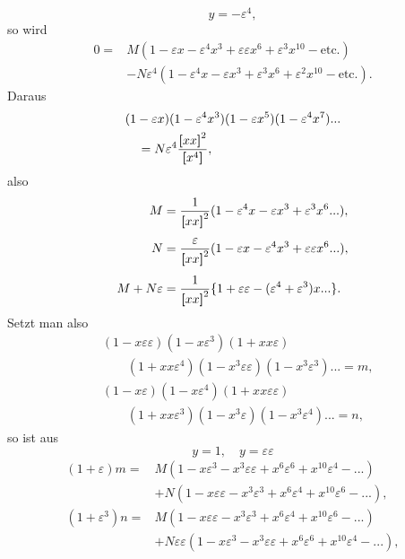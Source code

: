 \[y=-\varepsilon^4,\]
\noindent so wird
\[\begin{aligned}
0={}&M(1-\varepsilon x-\varepsilon^4x^3+\varepsilon\varepsilon x^6+\varepsilon^3x^{10}-\text{etc.})\\
&-N\varepsilon^4(1-\varepsilon^4x-\varepsilon x^3+\varepsilon^3x^6+\varepsilon^2x^{10}-\text{etc.}).
\end{aligned}\]
\noindent Daraus
\[\begin{aligned}
&(1-\varepsilon x)(1-\varepsilon^4x^3)(1-\varepsilon x^5)(1-\varepsilon^4x^7){.}{.}{.}\\
&\quad=N\varepsilon^4\frac{\boldsymbol{[}xx\boldsymbol{]}^2}{\boldsymbol{[}x^4\boldsymbol{]}},
\end{aligned}\]
\noindent also
\[\begin{aligned}
M&=\frac1{\boldsymbol{[}xx\boldsymbol{]}^2}(1-\varepsilon^4x-\varepsilon x^3+\varepsilon^3x^6{.}{.}{.}),\\[4pt]
N&=\frac\varepsilon{\boldsymbol{[}xx\boldsymbol{]}^2}(1-\varepsilon x-\varepsilon^4x^3+\varepsilon\varepsilon x^6{.}{.}{.}),\\[4pt]
M+N\varepsilon&=\frac1{\boldsymbol{[}xx\boldsymbol{]}^2}\{1+\varepsilon\varepsilon-(\varepsilon^4+\varepsilon^3)x{.}{.}{.}\}.
\end{aligned}\]
\noindent Setzt man also
\[\begin{aligned}
&(1-x\varepsilon\varepsilon)(1-x\varepsilon^3)(1+xx\varepsilon)\\
&\qquad(1+xx\varepsilon^4)(1-x^3\varepsilon\varepsilon)(1-x^3\varepsilon^3){.}{.}{.}=m,\\
&(1-x\varepsilon)(1-x\varepsilon^4)(1+xx\varepsilon\varepsilon)\\
&\qquad(1+xx\varepsilon^3)(1-x^3\varepsilon)(1-x^3\varepsilon^4){.}{.}{.}=n,
\end{aligned}\]
\noindent so ist aus
\[y=1,\quad y=\varepsilon\varepsilon\]
\[\begin{aligned}
(1+\varepsilon)m={}&M(1-x\varepsilon^3-x^3\varepsilon\varepsilon+x^6\varepsilon^6+x^{10}\varepsilon^4-{.}{.}{.})\\
&+N(1-x\varepsilon\varepsilon-x^3\varepsilon^3+x^6\varepsilon^4+x^{10}\varepsilon^6-{.}{.}{.}),\\[5pt]
(1+\varepsilon^3)n={}&M(1-x\varepsilon\varepsilon-x^3\varepsilon^3+x^6\varepsilon^4+x^{10}\varepsilon^6-{.}{.}{.})\\
&+N\varepsilon\varepsilon(1-x\varepsilon^3-x^3\varepsilon\varepsilon+x^6\varepsilon^6+x^{10}\varepsilon^4-{.}{.}{.}),
\end{aligned}\]
\clearpage
{}
